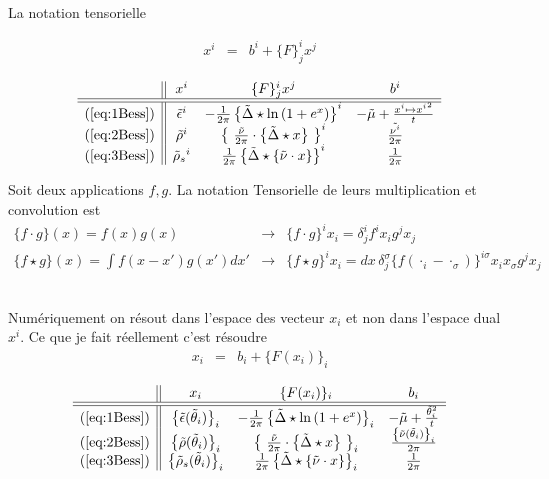 {~}\\

La notation tensorielle 


\begin{eqnarray}
	x^i & = & b^i + \{F\}^i_j  x^j  	
\end{eqnarray}


$$
\begin{array}{c||ccc}
	& x^i & \{F\}^i_j  x^j & b^i\\
	\hline\hline
	(\ref{eq:1Bess}) & \tilde{\epsilon}^i & - \frac{1}{2 \pi} \left \{\tilde{\Delta} \star \ln \left ( 1 + e^{x } \right )  \right \}^i  & - \tilde{\mu} + \frac{x^i  \mapsto {x^i }^2 }{t}	\\
	(\ref{eq:2Bess}) & \tilde{\rho}^i  &  \left  \{ \frac{\tilde{\nu}}{2 \pi} \cdot \left \{\tilde{\Delta} \star x \right  \} \right \}^i & \frac{\tilde{\nu^i}}{2 \pi} \\
	(\ref{eq:3Bess}) & {\tilde{\rho}_s}^i  &  \frac{1}{2 \pi} \left \{\tilde{\Delta} \star \{\tilde{\nu} \cdot  x\} \right \}^i & \frac{1}{2 \pi} 
\end{array}
$$

Soit deux applications $f , g $. La notation Tensorielle de leurs multiplication et convolution est 
\begin{eqnarray}
	\{f \cdot   g \} ( x ) = f(x)  g(x) & \rightarrow & \{ f \cdot g \}^i x_i = \delta^i_j f^ix_i g^j x_j  \\
	\{f \star  g \} ( x ) = {\textstyle \int f ( x - x' ) g ( x' )  d x '}  & \rightarrow &	 \{ f \star g  \}^i x_i  = dx \, \delta^\sigma_j \{  f ( \cdot_i -\cdot_\sigma  )\}^{i\sigma } x_i x_\sigma   g^j x_j   
\end{eqnarray}


{~}\\

Numériquement on résout dans l'espace des vecteur $x_i$ et non dans l'espace dual $x^i$. Ce que je fait réellement c'est résoudre 
\begin{eqnarray}
	x_i  & = & b_i  + \{F(x_i) \}_i  	
\end{eqnarray}

$$
\begin{array}{c||ccc}
	& x_i & \{F(x_i) \}_i & b_i \\
	\hline\hline
	(\ref{eq:1Bess}) & \left \{\tilde{\epsilon}(\tilde{\theta}_i) \right \}_i  & -\frac{1}{2 \pi} \left \{\tilde{\Delta} \star \ln \left ( 1 + e^{x } \right )  \right \}_i  & - \tilde{\mu} + \frac{\tilde{\theta}_i^2 }{t}	\\
	(\ref{eq:2Bess}) & \left \{\tilde{\rho}(\tilde{\theta}_i) \right \}_i  &  \left  \{ \frac{\tilde{\nu}}{2 \pi} \cdot \left \{\tilde{\Delta} \star x \right  \} \right \}_i & \frac{\left \{\tilde{\nu}(\tilde{\theta}_i) \right \}_i}{2 \pi} \\
	(\ref{eq:3Bess}) &  \left \{\tilde{\rho}_s(\tilde{\theta}_i) \right \}_i & \frac{1}{2 \pi} \left \{\tilde{\Delta} \star \{\tilde{\nu} \cdot  x\} \right \}_i & \frac{1}{2 \pi} 
\end{array}\\
$$

